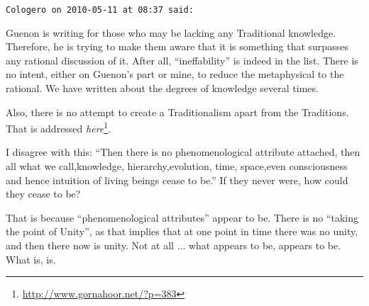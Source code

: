 \begin{footnotesize}
\begin{sffamily}
\hfill

\texttt{Cologero on 2010-05-11 at 08:37 said:}

Guenon is writing for those who may be lacking any Traditional knowledge. Therefore, he is trying to make them aware that it is something that surpasses any rational discussion of it. After all, ``ineffability'' is indeed in the list. There is no intent, either on Guenon's part or mine, to reduce the metaphysical to the rational. We have written about the degrees of knowledge several times.

Also, there is no attempt to create a Traditionalism apart from the Traditions. That is addressed
\textit{here}\footnote{\url{http://www.gornahoor.net/?p=383}}.


I disagree with this: ``Then there is no phenomenological attribute attached, then all what we call,knowledge, hierarchy,evolution, time, space,even consciousness and hence intuition of living beings cease to be.'' If they never were, how could they cease to be?

That is because ``phenomenological attributes'' appear to be. There is no ``taking the point of Unity'', as that implies that at one point in time there was no unity, and then there now is unity. Not at all ... what appears to be, appears to be. What is, is.

\hfill

\end{sffamily}
\end{footnotesize}

